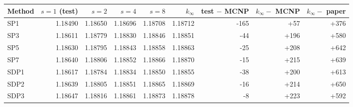 \begin{tabular}{lrrrrrrrr}
\hline
Method & $s=1$ (test) & $s=2$ & $s=4$ & $s=8$ & $k_\infty$ & test $-$ MCNP & $k_\infty -$ MCNP & $k_\infty -$ paper \\
\hline
SP1 & 1.18490 & 1.18650 & 1.18696 & 1.18708 & 1.18712 & -165 & +57 & +376 \\
SP3 & 1.18611 & 1.18779 & 1.18830 & 1.18846 & 1.18851 & -44 & +196 & +580 \\
SP5 & 1.18630 & 1.18795 & 1.18843 & 1.18858 & 1.18863 & -25 & +208 & +642 \\
SP7 & 1.18640 & 1.18806 & 1.18852 & 1.18866 & 1.18870 & -15 & +215 & +639 \\
SDP1 & 1.18617 & 1.18784 & 1.18834 & 1.18850 & 1.18855 & -38 & +200 & +613 \\
SDP2 & 1.18639 & 1.18805 & 1.18851 & 1.18865 & 1.18869 & -16 & +214 & +650 \\
SDP3 & 1.18647 & 1.18816 & 1.18861 & 1.18873 & 1.18878 & -8 & +223 & +592 \\
\hline
\end{tabular}
